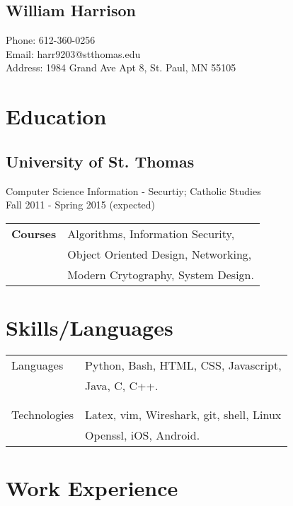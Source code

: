 \documentclass{article}[11pt]
\begin{document}
\setlength{\parskip}{0pt}


\begin{multicols}{2}
	{\section*{\Huge{William Harrison}}}
	\columnbreak
	\begin{flushleft}
		Phone: 612-360-0256 \\
		Email: harr9203@stthomas.edu \\
		Address: 1984 Grand Ave Apt 8, St. Paul, MN 55105
	\end{flushleft}
\end{multicols}
\begin{multicols}{2}
	\section*{Education}
	\subsection*{University of St. Thomas}
	Computer Science Information - Securtiy; Catholic Studies\\
	Fall 2011 - Spring 2015 (expected)\\
	\noindent
	\begin{tabular}{@{}p{1.5cm}l}
	\noindent\textbf{Courses}	& Algorithms, Information Security, \\
				& Object Oriented Design, Networking, \\
				& Modern Crytography, System Design. \\
	\end{tabular}
		\vfill
		\columnbreak
	\section*{Skills/Languages}
	\begin{tabular}{@{}p{2cm}l}
	Languages	& Python, Bash, HTML, CSS, Javascript, \\ 
			& Java, C, C++. \\\\\\
	Technologies	& Latex, vim, Wireshark, git, shell, Linux \\
			& Openssl, iOS, Android. \\
	\end{tabular}
		\vfill
		\columnbreak
\end{multicols}
	\section*{Work Experience}
\end{document}
